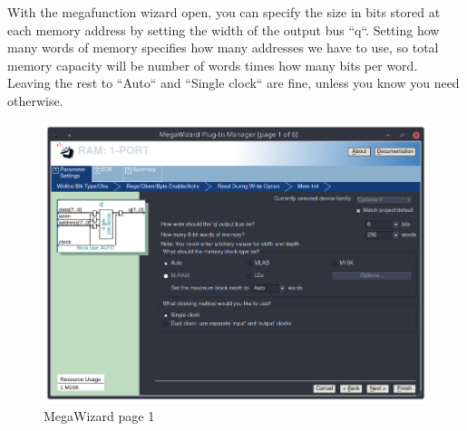 \documentclass[letter,12pt]{article}
\begin{document}
With the megafunction wizard open, you can specify the size in bits stored at each memory address by setting the width of the output bus ``q``. Setting how many words of memory specifies how many addresses we have to use, so total memory capacity will be number of words times how many bits per word. Leaving the rest to ``Auto`` and ``Single clock`` are fine, unless you know you need otherwise.

\begin{figure}[H]
  \centering
  \includegraphics[width=.83\linewidth]{pics/Mega1.png}
  \caption{MegaWizard page 1}
\end{figure}
\end{document}

